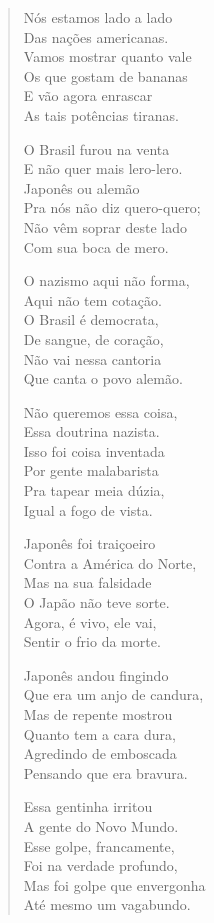 \begin{verse}
Nós estamos lado a lado\\
Das nações americanas.\\
Vamos mostrar quanto vale\\
Os que gostam de bananas\\
E vão agora enrascar\\
As tais potências tiranas.


O Brasil furou na venta\\
E não quer mais lero-lero.\\
Japonês ou alemão\\
Pra nós não diz quero-quero;\\
Não vêm soprar deste lado\\
Com sua boca de mero.

O nazismo aqui não forma,\\
Aqui não tem cotação.\\
O Brasil é democrata, \\
De sangue, de coração,\\
Não vai nessa cantoria\\
Que canta o povo alemão.

Não queremos essa coisa,\\
Essa doutrina nazista.\\
Isso foi coisa inventada\\
Por gente malabarista\\
Pra tapear meia dúzia,\\
Igual a fogo de vista.

Japonês foi traiçoeiro\\
Contra a América do Norte,\\
Mas na sua falsidade\\
O Japão não teve sorte.\\
Agora, é vivo, ele vai,\\
Sentir o frio da morte.


Japonês andou fingindo\\
Que era um anjo de candura,\\
Mas de repente mostrou\\
Quanto tem a cara dura,\\
Agredindo de emboscada\\
Pensando que era bravura.

Essa gentinha irritou\\
A gente do Novo Mundo.\\
Esse golpe, francamente,\\
Foi na verdade profundo,\\
Mas foi golpe que envergonha\\
Até mesmo um vagabundo.


\end{verse}
